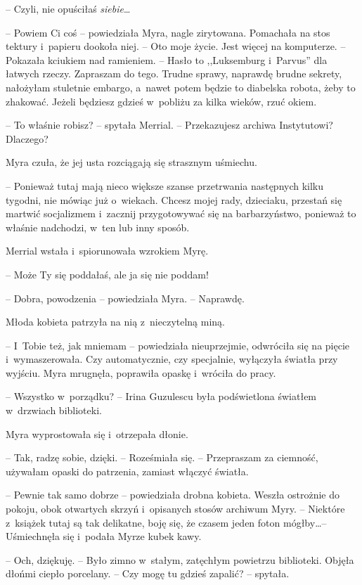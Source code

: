 \documentclass[oneside,polish,11pt,sfheadings]{mwbk}
\begin{document}
-- Czyli, nie opuściłaś \textit{siebie}\ldots

-- Powiem Ci coś -- powiedziała Myra, nagle zirytowana. Pomachała na stos
tektury i~papieru dookoła niej. -- Oto moje życie. Jest więcej na
komputerze. -- Pokazała kciukiem nad ramieniem. -- Hasło to ,,Luksemburg i~Parvus'' dla łatwych rzeczy. Zapraszam do tego. Trudne sprawy, naprawdę
brudne sekrety, nałożyłam stuletnie embargo, a~nawet potem będzie to
diabelska robota, żeby to zhakować. Jeżeli będziesz gdzieś w~pobliżu za
kilka wieków, rzuć okiem.

-- To właśnie robisz? -- spytała Merrial. -- Przekazujesz archiwa
Instytutowi? Dlaczego?

Myra czuła, że jej usta rozciągają się strasznym uśmiechu. 

-- Ponieważ
tutaj mają nieco większe szanse przetrwania następnych kilku tygodni,
nie mówiąc już o~wiekach. Chcesz mojej rady, dzieciaku, przestań się
martwić socjalizmem i~zacznij przygotowywać się na barbarzyństwo,
ponieważ to właśnie nadchodzi, w~ten lub inny sposób.

Merrial wstała i~spiorunowała wzrokiem Myrę. 

-- Może Ty się poddałaś, ale
ja się nie poddam!

-- Dobra, powodzenia -- powiedziała Myra. -- Naprawdę.

Młoda kobieta patrzyła na nią z~nieczytelną miną. 

-- I~Tobie też, jak
mniemam -- powiedziała nieuprzejmie, odwróciła się na pięcie i~wymaszerowała. Czy automatycznie, czy specjalnie, wyłączyła światła przy
wyjściu. Myra mrugnęła, poprawiła opaskę i~wróciła do pracy.

-- Wszystko w~porządku? -- Irina Guzulescu była podświetlona światłem w~drzwiach biblioteki.

Myra wyprostowała się i~otrzepała dłonie.

-- Tak, radzę sobie, dzięki. -- Roześmiała się. -- Przepraszam za ciemność,
używałam opaski do patrzenia, zamiast włączyć światła.

-- Pewnie tak samo dobrze -- powiedziała drobna kobieta. Weszła ostrożnie
do pokoju, obok otwartych skrzyń i~opisanych stosów archiwum Myry. -- Niektóre z~książek tutaj są tak delikatne, boję się, że czasem jeden
foton mógłby\ldots -- Uśmiechnęła się i~podała Myrze kubek kawy.

-- Och, dziękuję. -- Było zimno w~stałym, zatęchłym powietrzu biblioteki.
Objęła dłońmi ciepło porcelany. -- Czy mogę tu gdzieś zapalić? -- spytała.
\end{document}

